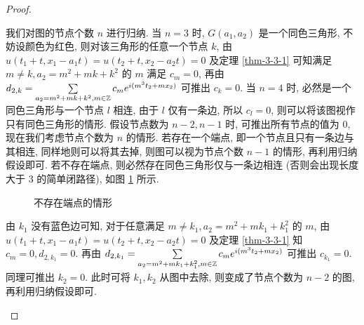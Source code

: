 \begin{proof}
\begin{enumerate}
    我们对图的节点个数 $n$ 进行归纳. 当 $n=3$ 时, $G(a_1,a_2)$ 是一个同色三角形, 不妨设颜色为红色, 则对该三角形的任意一个节点 $k$, 由 $u(t_1+t,x_1-a_1t)=u(t_2+t,x_2-a_2t)=0$ 及定理 \ref{thm-3-3-1} 可知满足 $m\neq k, a_2=m^2+mk+k^2$ 的 $m$ 满足 $c_m=0$, 再由 $d_{2,k}=\sum\limits_{a_2=m^2+mk+k^2,m\in\mathbb{Z}}c_m e^{i(m^3t_2+mx_2)}$ 可推出 $c_k=0$.
    当 $n=4$ 时, 必然是一个同色三角形与一个节点 $l$ 相连, 由于 $l$ 仅有一条边, 所以 $c_l=0$, 则可以将该图视作只有同色三角形的情形. 假设节点数为 $n-2,n-1$ 时, 可推出所有节点的值为 $0$, 现在我们考虑节点个数为 $n$ 的情形. 若存在一个端点, 即一个节点且只有一条边与其相连, 同样地则可以将其去掉, 则图可以视为节点个数 $n-1$ 的情形, 再利用归纳假设即可. 若不存在端点, 则必然存在同色三角形仅与一条边相连 (否则会出现长度大于 $3$ 的简单闭路径), 如图  \ref{no-end-points} 所示.
    \begin{figure}[htbp]
        \centering
        \caption{不存在端点的情形}
        \label{no-end-points}
    \end{figure}
    由 $k_1$ 没有蓝色边可知, 对于任意满足 $m\neq k_1,a_2=m^2+mk_1+k_1^2$ 的 $m$, 由 $u(t_1+t,x_1-a_1t)=u(t_2+t,x_2-a_2t)=0$ 及定理 \ref{thm-3-3-1} 知 $c_m=0,d_{2,k_1}=0$. 再由 $d_{2,k_1}=\sum\limits_{a_2=m^2+mk_1+k_1^2,m\in\mathbb{Z}} c_me^{i(m^3t_2+mx_2)}$ 可推出 $c_{k_1}=0$. 同理可推出 $k_2=0$. 此时可将 $k_1,k_2$ 从图中去除, 则变成了节点个数为 $n-2$ 的图, 再利用归纳假设即可.   
\end{enumerate}


\end{proof}
